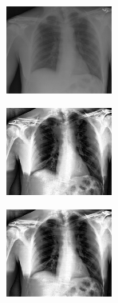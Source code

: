 \documentclass[spanish,twocolumn]{article}
\begin{document}
{\begin{minipage}[b]{1.0\linewidth}
\end{minipage}

\noindent\begin{minipage}[b]{1.0\linewidth}
  \centering
   
   \begin{minipage}[t]{0.3\linewidth}  
   		\centering
        \includegraphics[width=3.5cm]{Figures/entropia_local_ltg/imagen3.png}
  	\end{minipage}
  \hspace{1pt}
   \begin{minipage}[t]{0.3\linewidth}  
   		\centering
        \includegraphics[width=3.5cm]{Figures/entropia_local_ltg/imagen3_210_2_0-080847.png}
  	\end{minipage}
  \hspace{1pt}
   \begin{minipage}[t]{0.3\linewidth}  
   		\centering
        \includegraphics[width=3.5cm]{Figures/entropia_local_ltg/imagen3_27_2_1.png}
  	\end{minipage}
  \vspace{0.5cm}
    \label{fig:resultado6}

\end{minipage}

\noindent\begin{minipage}[b]{1.0\linewidth}
  

\end{minipage}}
\end{document}

